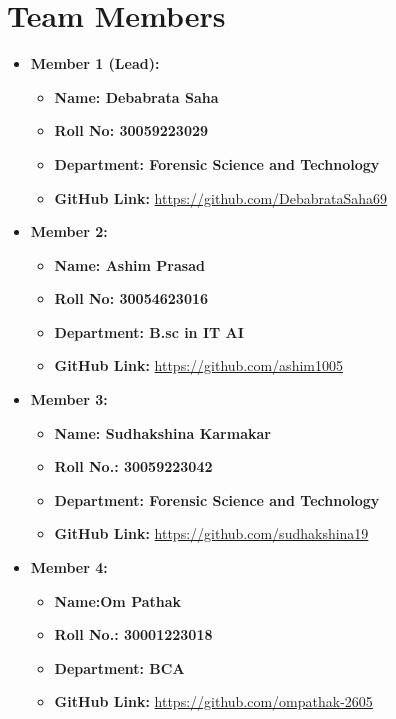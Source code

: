 \documentclass[a4paper,15pt]{article}
\begin{document}
\section*{Team Members}
\begin{itemize}[leftmargin=1.5cm]
    \item \textbf{Member 1 (Lead):} 
    \begin{itemize}[leftmargin=1.5cm]
        \item \textbf{Name: Debabrata Saha} 
        \item \textbf{Roll No: 30059223029}
        \item \textbf{Department: Forensic Science and Technology} 
        \item \textbf{GitHub Link:} \url{https://github.com/DebabrataSaha69}
\end{itemize}

    \item \textbf{Member 2:} 
    \begin{itemize}[leftmargin=1.5cm]
        \item \textbf{Name: Ashim Prasad } 
        \item \textbf{Roll No: 30054623016 } 
        \item \textbf{Department: B.sc in IT AI } 
        \item \textbf{GitHub Link:} \url{https://github.com/ashim1005}
    \end{itemize}

    \item \textbf{Member 3:} 
    \begin{itemize}[leftmargin=1.5cm]
        \item \textbf{Name: Sudhakshina Karmakar} 
        \item \textbf{Roll No.: 30059223042} 
        \item \textbf{Department: Forensic Science and Technology} 
        \item \textbf{GitHub Link:} \url{https://github.com/sudhakshina19}
    \end{itemize}

    \item \textbf{Member 4:} 
    \begin{itemize}[leftmargin=1.5cm]
        \item \textbf{Name:Om Pathak } 
        \item \textbf{Roll No.: 30001223018 } 
        \item \textbf{Department: BCA } 
        \item \textbf{GitHub Link:} \url{https://github.com/ompathak-2605}
    \end{itemize}


\end{itemize}
\end{document}
